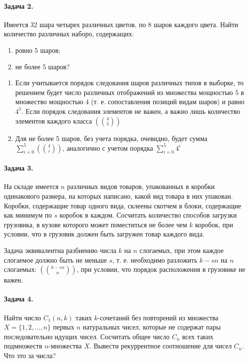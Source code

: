 \documentclass[a4paper,12pt]{article}
\begin{document}
\paragraph{Задача 2.} Имеется 32 шара четырех различных цветов, по 8 шаров каждого цвета. Найти количество различных наборо, содержащих:
\begin{enumerate}
\item ровно 5 шаров;

\item не более 5 шаров?
\end{enumerate}

\begin{Solution}
\begin{enumerate}
\item Если учитывается порядок следования шаров различных типов в выборке, то решением будет число различных отображений из множества мощностью $5$ в множество мощностью $4$ (т. е. сопоставления позиций видам шаров) и равно $4^5$. Если порядок следования элементов не важен, а важно лишь количество элементов каждого класса $\left(\binom{4}{5}\right)$

\item Для не более 5 шаров, без учета порядка, очевидно, будет сумма $\sum_{i=0}^{5} \left(\binom{4}{i}\right)$, аналогично с учетом порядка $\sum_{i=0}^{5}4^i$
\end{enumerate}
\end{Solution}

\paragraph{Задача 3.} На складе имеется $n$ различных видов товаров, упакованных в коробки одинакового размера, на которых написано, какой вид товара в них упакован. Коробки, содержащие товар одного вида, склеены скотчем в блоки, содержащие как минимум по $s$ коробок в каждом. Сосчитать количество способов загрузки грузовика, в кузове которого может поместиться не более чем $k$ коробок, при условии, что в грузовик должен быть загружен товар каждого вида.

\begin{Solution}
Задача эквивалентна разбиению числа $k$ на $n$ слогаемых, при этом каждое слогаемое должно быть не меньше $s$, т. е. необходимо разложить $k-sn$ на $n$ слогаемых: $\left(\binom{k-sn}{n}\right)$, при условии, что порядок расположения в грузовике не важен.
\end{Solution}

\paragraph{Задача 4.} Найти число $C_1 \left(n,k\right)$ таких $k$-сочетаний без повторений из множества $X = \{1,2,...,n\}$ первых $n$ натуральных чисел, которые не содержат пары последовательно идущих чисел. Сосчитать общее число $C_n$ всех таких подмножеств $n$-множества $X$. Вывести рекуррентное соотношение для чисел $C_n$. Что это за числа?
\end{document}

